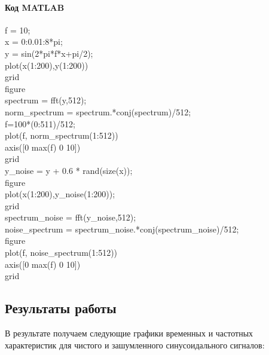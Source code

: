 \documentclass[10pt,a4paper]{article}
\begin{document}
\paragraph{Код MATLAB}
\begin{flushleft}
f = 10;\\
x = 0:0.01:8*pi;\\
y = sin(2*pi*f*x+pi/2);\\
plot(x(1:200),y(1:200))\\
grid\\
figure\\
spectrum = fft(y,512);\\
norm\_spectrum = spectrum.*conj(spectrum)/512;\\
f=100*(0:511)/512;\\
plot(f, norm\_spectrum(1:512))\\
axis([0 max(f) 0 10])\\
grid\\
y\_noise = y + 0.6 * rand(size(x));\\
figure\\
plot(x(1:200),y\_noise(1:200));\\
grid\\
spectrum\_noise = fft(y\_noise,512);\\
noise\_spectrum = spectrum\_noise.*conj(spectrum\_noise)/512;\\
figure\\
plot(f, noise\_spectrum(1:512))\\
axis([0 max(f) 0 10])\\
grid\\
\end{flushleft}
\subsection{Результаты работы}
В результате получаем следующие графики временных и частотных характеристик для чистого и зашумленного синусоидального сигналов:
\end{document}
